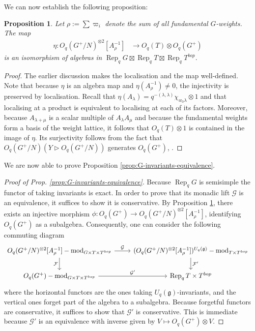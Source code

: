 \documentclass[a4paper]{article}
\numberwithin{equation}{section}
\newtheorem{proposition}[counter]{Proposition}
\newcommand{\1}{{\mathrm{1}\mkern-4mu{\mathchoice{}{}{\mskip-0.5mu}{\mskip-1mu}}\mathrm{l}}}
\DeclareMathOperator{\Rep}{Rep}
\newcommand{\g}{\mathfrak{g}}
\renewcommand{\mod}{\mathrm{mod}}
\begin{document}
We can now establish the following proposition:
\begin{proposition}\label{prop:generic-position-flags-iso}
Let $\rho := \sum\varpi_i$ denote the sum of all fundamental $G$-weights. The map 
    \begin{equation}\label{eq:generic-position-flags-iso}
        \begin{aligned}
             \eta: O_q(G^+/N)^{\otimes 2}[A_\rho^{-1}] &\to O_q(T) \otimes O_q(G^+)
        \end{aligned}
    \end{equation}
        is an isomorphism of algebras in $\Rep_qG\boxtimes \Rep_qT\boxtimes \Rep_qT^{bop}$.
\end{proposition}
\begin{proof}
    The earlier discussion makes the localisation and the map well-defined. Note that because $\eta$ is an algebra map and $\eta( A_{\rho}^{-1}) \neq 0$, the injectivity is preserved by localisation. Recall that $\eta(A_\lambda) = q^{-(\lambda,\lambda)}\chi_{w_0\lambda} \otimes 1$ and that localising at a product is equivalent to localising at each of its factors. Moreover, because $A_{\lambda+\mu}$ is a scalar multiple of $A_\lambda A_\mu$ and because the fundamental weights form a basis of the weight lattice, it follows that $O_q(T) \otimes 1$ is contained in the image of $\eta$. Its surjectivity follows from the fact that $O_q(G^+/N)(Y \rhd O_q(G^+/N))$ generates $O_q(G^+)$, \cite[Section 9]{Joseph}.
\end{proof}

We are now able to prove Proposition \ref{prop:G-invariants-equivalence}.
\begin{proof}[Proof of Prop. \ref{prop:G-invariants-equivalence}]
Because $\Rep_qG$ is semisimple the functor  of taking invariants is exact. In order to prove that its monadic lift $\mathcal{G}$ is an equivalence, it suffices to show it is conservative. By Proposition \ref{prop:generic-position-flags-iso}, there exists an injective morphism $\phi: O_q(G^+) \to  O_q(G^+/N)^{\otimes2}[A_\rho^{-1}]$, identifying $O_q(G^+)$ as a subalgebra. Consequently, one can consider the following commuting diagram
\begin{equation}
\begin{tikzcd}
O_q(G^+/N)^{\otimes2}[A_\rho^{-1}]-\mod_{G\times T\times T^{bop}}
  \arrow[r, "\mathcal{G}"]
  \arrow[d, "\mathcal{F}"']
&
(O_q(G^+/N)^{\otimes2}[A_\rho^{-1}])^{U_q(\g)}-\mod_{T\times T^{bop}}
  \arrow[d, "\mathcal{F}'"]
\\
O_q(G^+)-\mod_{G\times T\times T^{bop}}
  \arrow[r, "\mathcal{G}'"]
&
\Rep_q{T\times T^{bop}}
\end{tikzcd}
\end{equation}
where the horizontal functors are the ones taking $U_q(\g)$-invariants, and the vertical ones forget part of the algebra to a subalgebra. Because forgetful functors are conservative, it suffices to show that $\mathcal{G}'$ is conservative. This is immediate because $\mathcal{G}'$ is an equivalence with inverse given by $V \mapsto O_q(G^+) \otimes V$.
\end{proof}
\end{document}
